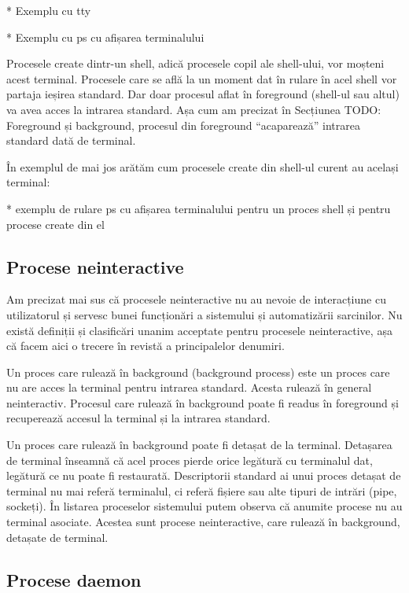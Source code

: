 * Exemplu cu tty

* Exemplu cu ps cu afișarea terminalului

Procesele create dintr-un shell, adică procesele copil ale shell-ului, vor
moșteni acest terminal. Procesele care se află la un moment dat în rulare în
acel shell vor partaja ieșirea standard. Dar doar procesul aflat în foreground
(shell-ul sau altul) va avea acces la intrarea standard. Așa cum am precizat în
Secțiunea TODO: Foreground și background, procesul din foreground “acaparează”
intrarea standard dată de terminal.

În exemplul de mai jos arătăm cum procesele create din shell-ul curent au
același terminal:

* exemplu de rulare ps cu afișarea terminalului pentru un proces shell și pentru
procese create din el

\subsection{Procese neinteractive}
\label{sec:procese-interactivitate-neinteractive}

Am precizat mai sus că procesele neinteractive nu au nevoie de interacțiune cu
utilizatorul și servesc bunei funcționări a sistemului și automatizării
sarcinilor. Nu există definiții și clasificări unanim acceptate pentru procesele
neinteractive, așa că facem aici o trecere în revistă a principalelor denumiri.

Un proces care rulează în background (background process) este un proces care nu
are acces la terminal pentru intrarea standard. Acesta rulează în general
neinteractiv. Procesul care rulează în background poate fi readus în foreground
și recuperează accesul la terminal și la intrarea standard.

Un proces care rulează în background poate fi detașat de la terminal. Detașarea
de terminal înseamnă că acel proces pierde orice legătură cu terminalul dat,
legătură ce nu poate fi restaurată. Descriptorii standard ai unui proces detașat
de terminal nu mai referă terminalul, ci referă fișiere sau alte tipuri de
intrări (pipe, sockeți). În listarea proceselor sistemului putem observa că
anumite procese nu au terminal asociate. Acestea sunt procese neinteractive,
care rulează în background, detașate de terminal.

\subsection{Procese daemon}
\label{sec:procese-interactivitate-daemon}

